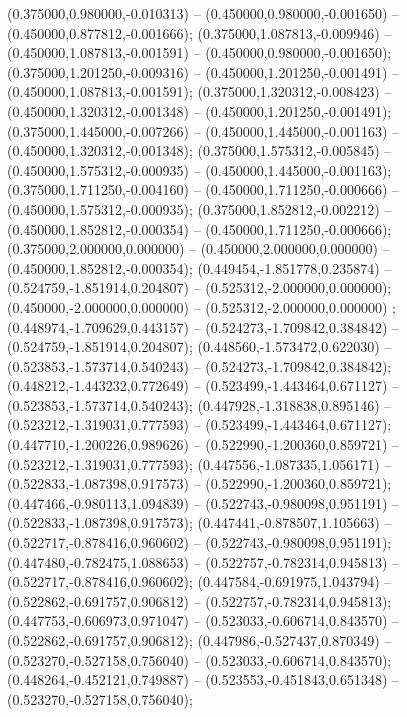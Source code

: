  (0.375000,0.980000,-0.010313) -- (0.450000,0.980000,-0.001650) -- (0.450000,0.877812,-0.001666);
 (0.375000,1.087813,-0.009946) -- (0.450000,1.087813,-0.001591) -- (0.450000,0.980000,-0.001650);
 (0.375000,1.201250,-0.009316) -- (0.450000,1.201250,-0.001491) -- (0.450000,1.087813,-0.001591);
 (0.375000,1.320312,-0.008423) -- (0.450000,1.320312,-0.001348) -- (0.450000,1.201250,-0.001491);
 (0.375000,1.445000,-0.007266) -- (0.450000,1.445000,-0.001163) -- (0.450000,1.320312,-0.001348);
 (0.375000,1.575312,-0.005845) -- (0.450000,1.575312,-0.000935) -- (0.450000,1.445000,-0.001163);
 (0.375000,1.711250,-0.004160) -- (0.450000,1.711250,-0.000666) -- (0.450000,1.575312,-0.000935);
 (0.375000,1.852812,-0.002212) -- (0.450000,1.852812,-0.000354) -- (0.450000,1.711250,-0.000666);
 (0.375000,2.000000,0.000000) -- (0.450000,2.000000,0.000000) -- (0.450000,1.852812,-0.000354);
 (0.449454,-1.851778,0.235874) -- (0.524759,-1.851914,0.204807) -- (0.525312,-2.000000,0.000000);
 (0.450000,-2.000000,0.000000) -- (0.525312,-2.000000,0.000000) ;
 (0.448974,-1.709629,0.443157) -- (0.524273,-1.709842,0.384842) -- (0.524759,-1.851914,0.204807);
 (0.448560,-1.573472,0.622030) -- (0.523853,-1.573714,0.540243) -- (0.524273,-1.709842,0.384842);
 (0.448212,-1.443232,0.772649) -- (0.523499,-1.443464,0.671127) -- (0.523853,-1.573714,0.540243);
 (0.447928,-1.318838,0.895146) -- (0.523212,-1.319031,0.777593) -- (0.523499,-1.443464,0.671127);
 (0.447710,-1.200226,0.989626) -- (0.522990,-1.200360,0.859721) -- (0.523212,-1.319031,0.777593);
 (0.447556,-1.087335,1.056171) -- (0.522833,-1.087398,0.917573) -- (0.522990,-1.200360,0.859721);
 (0.447466,-0.980113,1.094839) -- (0.522743,-0.980098,0.951191) -- (0.522833,-1.087398,0.917573);
 (0.447441,-0.878507,1.105663) -- (0.522717,-0.878416,0.960602) -- (0.522743,-0.980098,0.951191);
 (0.447480,-0.782475,1.088653) -- (0.522757,-0.782314,0.945813) -- (0.522717,-0.878416,0.960602);
 (0.447584,-0.691975,1.043794) -- (0.522862,-0.691757,0.906812) -- (0.522757,-0.782314,0.945813);
 (0.447753,-0.606973,0.971047) -- (0.523033,-0.606714,0.843570) -- (0.522862,-0.691757,0.906812);
 (0.447986,-0.527437,0.870349) -- (0.523270,-0.527158,0.756040) -- (0.523033,-0.606714,0.843570);
 (0.448264,-0.452121,0.749887) -- (0.523553,-0.451843,0.651348) -- (0.523270,-0.527158,0.756040);
